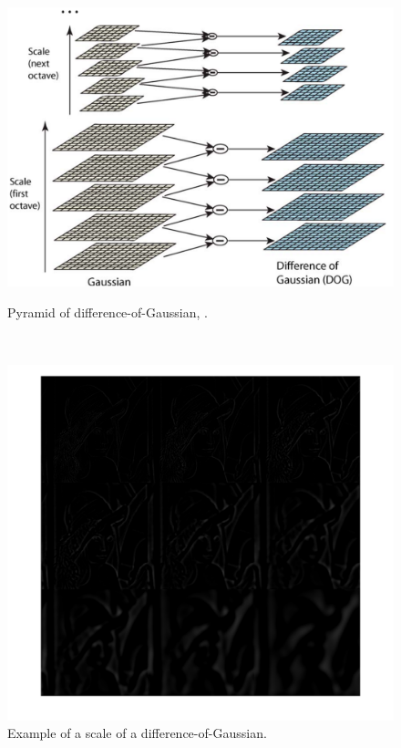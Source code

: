 \documentclass[12pt]{article}
\begin{document}
\begin{figure}[htbp]
	\centering
	\begin{minipage}[t]{.48\textwidth}
		\centering
		\includegraphics[width=1.05\textwidth]{images/diffOfGauFromPaper}
		\caption{Pyramid of difference-of-Gaussian, \cite{Lowe2004}.}
		\label{fig:difOfGauPyramid}
	\end{minipage} ~
	\begin{minipage}[t]{.48\textwidth}
		\centering
		\includegraphics[width=1\textwidth]{images/dogSpace}
		\caption{Example of a scale of a difference-of-Gaussian.}
		\label{fig:difOfGauSample}
	\end{minipage}
\end{figure}
\end{document}

